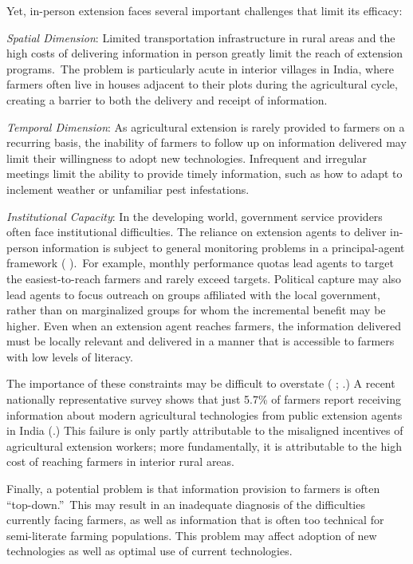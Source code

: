 \documentclass[12pt]{article}
\begin{document}
{\normalsize Yet, in-person extension faces several important challenges
that limit its efficacy:}

{\normalsize \noindent \emph{Spatial Dimension}: Limited transportation
infrastructure in rural areas and the high costs of delivering information
in person greatly limit the reach of extension programs.\ The problem is
particularly acute in interior villages in India, where farmers often live
in houses adjacent to their plots during the agricultural cycle, creating a
barrier to both the delivery and receipt of information. }

{\normalsize \emph{Temporal Dimension}: As agricultural extension is rarely
provided to farmers on a recurring basis, the inability of farmers to follow
up on information delivered may limit their willingness to adopt new
technologies. Infrequent and irregular meetings limit the ability to provide
timely information, such as how to adapt to inclement weather or unfamiliar
pest infestations. }

{\normalsize \emph{Institutional Capacity}: In the developing world,
government service providers often face institutional difficulties. The
reliance on extension agents to deliver in-person information is subject to
general monitoring problems in a principal-agent framework (\citealp{AF_2007}%
).\ For example, monthly performance quotas lead agents to target the
easiest-to-reach farmers and rarely exceed targets. Political capture may
also lead agents to focus outreach on groups affiliated with the local
government, rather than on marginalized groups for whom the incremental
benefit may be higher. Even when an extension agent reaches farmers, the
information delivered must be locally relevant and delivered in a manner
that is accessible to farmers with low levels of literacy. }

{\normalsize The importance of these constraints may be difficult to overstate (%
\citealp{Birkhaeuser_1991}; \citealp{Saito_1990}.) A recent nationally
representative survey shows that just 5.7\% of farmers report receiving
information about modern agricultural technologies from public extension
agents in India (\citealp{GBA_2010}.) This failure is only partly
attributable to the misaligned incentives of agricultural extension workers;
more fundamentally, it is attributable to the high cost of reaching farmers
in interior rural areas. }

{\normalsize Finally, a potential problem is that information provision to
farmers is often \textquotedblleft top-down.\textquotedblright\ This may
result in an inadequate diagnosis of the difficulties currently facing
farmers, as well as information that is often too technical for
semi-literate farming populations. This problem may affect adoption of new
technologies as well as optimal use of current technologies. }
\end{document}
